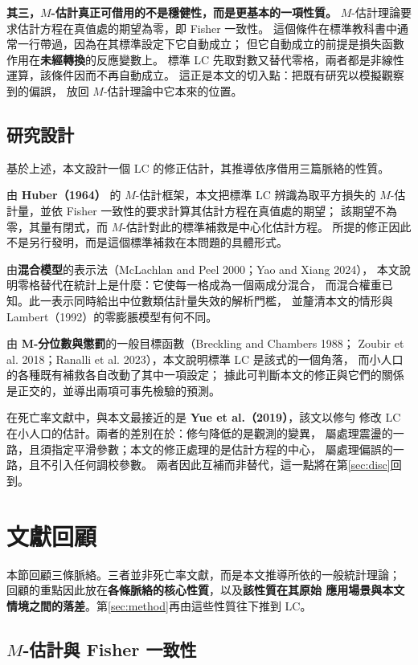 \documentclass[UTF8, fontset=macnew, a4paper, 12pt]{ctexart}
\begin{document}
\textbf{其三，$M$-估計真正可借用的不是穩健性，而是更基本的一項性質。}
$M$-估計理論要求估計方程在真值處的期望為零，即 Fisher 一致性。
這個條件在標準教科書中通常一行帶過，因為在其標準設定下它自動成立；
但它自動成立的前提是損失函數作用在\textbf{未經轉換}的反應變數上。
標準 LC 先取對數又替代零格，兩者都是非線性運算，該條件因而不再自動成立。
這正是本文的切入點：把既有研究以模擬觀察到的偏誤，
放回 $M$-估計理論中它本來的位置。

\subsection{研究設計}

基於上述，本文設計一個 LC 的修正估計，其推導依序借用三篇脈絡的性質。

由 \textbf{Huber（1964）} 的 $M$-估計框架，本文把標準 LC 辨識為取平方損失的
$M$-估計量，並依 Fisher 一致性的要求計算其估計方程在真值處的期望；
該期望不為零，其量有閉式，而 $M$-估計對此的標準補救是中心化估計方程。
所提的修正因此不是另行發明，而是這個標準補救在本問題的具體形式。

由\textbf{混合模型}的表示法（McLachlan and Peel 2000；Yao and Xiang 2024），
本文說明零格替代在統計上是什麼：它使每一格成為一個兩成分混合，
而混合權重已知。此一表示同時給出中位數類估計量失效的解析門檻，
並釐清本文的情形與 Lambert（1992）的零膨脹模型有何不同。

由 \textbf{M-分位數與懲罰}的一般目標函數（Breckling and Chambers 1988；
Zoubir et al. 2018；Ranalli et al. 2023），本文說明標準 LC 是該式的一個角落，
而小人口的各種既有補救各自改動了其中一項設定；
據此可判斷本文的修正與它們的關係是正交的，並導出兩項可事先檢驗的預測。

在死亡率文獻中，與本文最接近的是 \textbf{Yue et al.（2019）}，該文以修勻
修改 LC 在小人口的估計。兩者的差別在於：修勻降低的是觀測的變異，
屬處理震盪的一路，且須指定平滑參數；本文的修正處理的是估計方程的中心，
屬處理偏誤的一路，且不引入任何調校參數。
兩者因此互補而非替代，這一點將在第\ref{sec:disc}回到。

\section{文獻回顧}\label{sec:lit}

本節回顧三條脈絡。三者並非死亡率文獻，而是本文推導所依的一般統計理論；
回顧的重點因此放在\textbf{各條脈絡的核心性質}，以及\textbf{該性質在其原始
應用場景與本文情境之間的落差}。第\ref{sec:method}再由這些性質往下推到 LC。

\subsection{$M$-估計與 Fisher 一致性}
\end{document}
